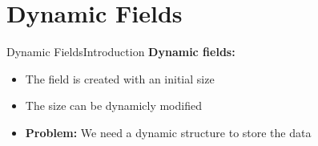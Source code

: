 \section{Dynamic Fields}


\begin{frame}{Dynamic Fields}{Introduction}
  \textbf{Dynamic fields:}
  \begin{itemize}
    \item
      The field is created with an initial size
    \item
      The size can be dynamicly modified
    \item
      \textbf{Problem:}
      We need a dynamic structure to store the data
  \end{itemize}
\end{frame}








